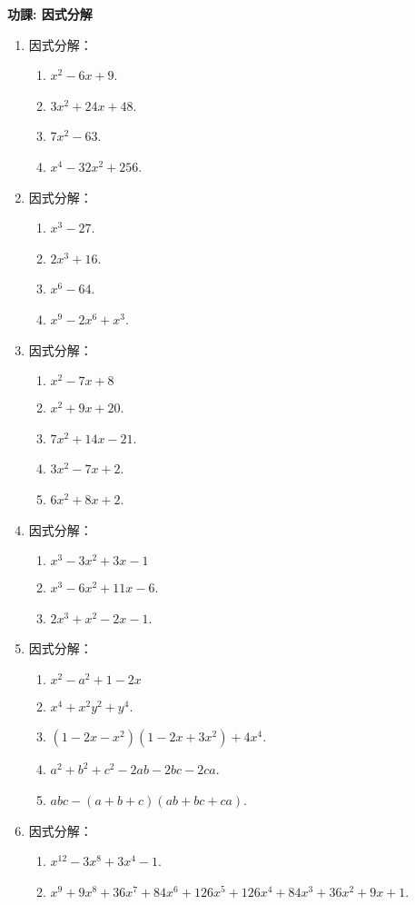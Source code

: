 \documentclass[11pt]{article}
\begin{document}
    \newpage

    \begin{center}
        \textbf{功課: 因式分解}
    \end{center}

    \begin{enumerate}
        \item 因式分解：\begin{enumerate}
            \item $x^2-6x+9$.
            \item $3x^2+24x+48$.
            \item $7x^2-63$.
            \item $x^4-32x^2+256$.
        \end{enumerate}
        \item 因式分解：\begin{enumerate}
            \item $x^3-27$.
            \item $2x^3+16$.
            \item $x^6-64$.
            \item $x^9-2x^6+x^3$.
        \end{enumerate}
        \item 因式分解：\begin{enumerate}
            \item $x^2-7x+8$
            \item $x^2+9x+20$.
            \item $7x^2+14x-21$.
            \item $3x^2-7x+2$.
            \item $6x^2+8x+2$.
        \end{enumerate}
        \item 因式分解：\begin{enumerate}
            \item $x^3-3x^2+3x-1$
            \item $x^3-6x^2+11x-6$.
            \item $2x^3+x^2-2x-1$.
        \end{enumerate}
        \item 因式分解：\begin{enumerate}
            \item $x^2-a^2+1-2x$
            \item $x^4+x^2y^2+y^4$.
            \item $(1-2x-x^2)(1-2x+3x^2)+4x^4$.
            \item $a^2+b^2+c^2-2ab-2bc-2ca$.
            \item $abc-(a+b+c)(ab+bc+ca)$.
        \end{enumerate}
        \item 因式分解：\begin{enumerate}
            \item $x^{12}-3x^8+3x^4-1$.
            \item $x^9+9x^8+36x^7+84x^6+126x^5+126x^4+84x^3+36x^2+9x+1$.
        \end{enumerate}
    \end{enumerate}
\end{document}
